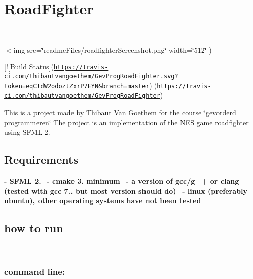 \section*{Road\+Fighter}

~\newline
 

$<$img src=\char`\"{}readme\+Files/roadfighter\+Screenshot.\+png\char`\"{} width=\char`\"{}512\char`\"{} )

\mbox{[}!\mbox{[}Build Status\mbox{]}(\href{https://travis-ci.com/thibautvangoethem/GevProgRoadFighter.svg?token=eqCtdW2odoztZxrP7EYN&branch=master}{\tt https\+://travis-\/ci.\+com/thibautvangoethem/\+Gev\+Prog\+Road\+Fighter.\+svg?token=eq\+Ctd\+W2odozt\+Zxr\+P7\+E\+Y\+N\&branch=master})\mbox{]}(\href{https://travis-ci.com/thibautvangoethem/GevProgRoadFighter}{\tt https\+://travis-\/ci.\+com/thibautvangoethem/\+Gev\+Prog\+Road\+Fighter})

This is a project made by Thibaut Van Goethem for the course \char`\"{}gevorderd programmeren\char`\"{} The project is an implementation of the N\+ES game roadfighter using S\+F\+ML 2.

\subsection*{Requirements}

{\bfseries -\/ S\+F\+ML 2.}~\newline
 {\bfseries -\/ cmake 3. minimum}~\newline
 {\bfseries -\/ a version of gcc/g++ or clang (tested with gcc 7.. but most version should do)}~\newline
 {\bfseries -\/ linux (preferably ubuntu), other operating systems have not been tested}~\newline


\subsection*{how to run}

~\newline
 \subsubsection*{command line\+:}

